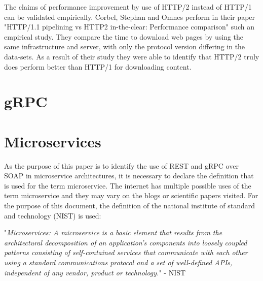 \documentclass[conference]{IEEEtran}
\begin{document}
The claims of performance improvement by use of HTTP/2 instead of HTTP/1 can be validated empirically. Corbel, Stephan and Omnes perform in their paper "HTTP/1.1 pipelining vs HTTP2 in-the-clear: Performance comparison" \cite{7745823} such an empirical study. They compare the time to download web pages by using the same infrastructure and server, with only the protocol version differing in the data-sets. As a result of their study they were able to identify that HTTP/2 truly does perform better than HTTP/1 for downloading content.

\section{gRPC}
\label{sec:grpc}



\section{Microservices}
\label{sec:micros}

As the purpose of this paper is to identify the use of REST and gRPC over SOAP in microservice architectures, it is necessary to declare the definition that is used for the term microservice. The internet has multiple possible uses of the term microservice and they may vary on the blogs or scientific papers visited. For the purpose of this document, the definition of the national institute of standard and technology (NIST) is used:

"\emph{Microservices: A microservice is a basic element that results from the architectural decomposition of an application’s components into loosely coupled patterns consisting of self-contained services that communicate with each other using a standard communications protocol and a set of well-defined APIs, independent of any vendor, product or technology.}" - NIST \cite{karmel2016nist}
\end{document}
